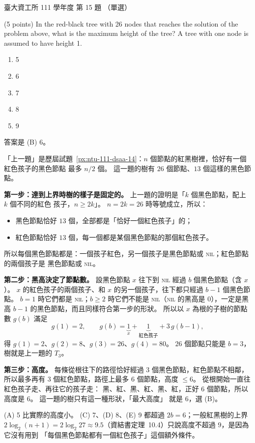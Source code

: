 \begin{pastexam}[label={px:ntu-111-dsaa-15}]{臺大資工所 111 學年度 第 15 題}
（單選）

(5 points) In the red-black tree with 26 nodes that reaches the solution of the problem above,
what is the maximum height of the tree? A tree with one node is assumed to have height 1.
\begin{enumerate}[label=(\Alph*)]
\item 5
\item 6
\item 7
\item 8
\item 9
\end{enumerate}
\end{pastexam}

\begin{pastsoln}
答案是 (B) 6。

「上一題」是歷屆試題~\ref{px:ntu-111-dsaa-14}：$n$ 個節點的紅黑樹裡，恰好有一個紅色孩子的黑色節點
最多 $n/2$ 個。 這一題的樹有 $26$ 個節點、$13$ 個這樣的黑色節點。

\textbf{第一步：達到上界時樹的樣子是固定的。} 上一題的證明是「$k$ 個黑色節點，配上 $k$ 個不同的紅色
孩子，$n \ge 2k$」。 $n = 2k = 26$ 時等號成立，所以：
\begin{itemize}
\item 黑色節點恰好 $13$ 個，全部都是「恰好一個紅色孩子」的；
\item 紅色節點恰好 $13$ 個，每一個都是某個黑色節點的那個紅色孩子。
\end{itemize}
所以每個黑色節點都是：一個孩子紅色，另一個孩子是黑色節點或 \textsc{nil}；紅色節點的兩個孩子是
黑色節點或 \textsc{nil}。

\textbf{第二步：黑高決定了節點數。} 設黑色節點 $x$ 往下到 \textsc{nil} 經過 $b$ 個黑色節點（含 $x$）。
$x$ 的紅色孩子的兩個孩子、和 $x$ 的另一個孩子，往下都只經過 $b - 1$ 個黑色節點。 $b = 1$ 時它們都是
\textsc{nil}；$b \ge 2$ 時它們不能是 \textsc{nil}（\textsc{nil} 的黑高是 $0$），一定是黑高 $b - 1$
的黑色節點，而且同樣符合第一步的形狀。 所以以 $x$ 為根的子樹的節點數 $g(b)$ 滿足
\[
g(1) = 2, \qquad g(b) = \underbrace{1}_{x} + \underbrace{1}_{\text{紅色孩子}} + 3\,g(b-1),
\]
得 $g(1) = 2$、$g(2) = 8$、$g(3) = 26$、$g(4) = 80$。 $26$ 個節點只能是 $b = 3$，樹就是上一題的
$T_3$。

\textbf{第三步：高度。} 每條從根往下的路徑恰好經過 $3$ 個黑色節點，紅色節點不相鄰，所以最多再有
$3$ 個紅色節點，路徑上最多 $6$ 個節點，高度 $\le 6$。 從根開始一直往紅色孩子走、再往它的孩子走：
黑、紅、黑、紅、黑、紅，正好 $6$ 個節點，所以高度是 $6$。 這一題的樹只有這一種形狀，「最大高度」
就是 $6$，選 (B)。

(A) 5 比實際的高度小。 (C) 7、(D) 8、(E) 9 都超過 $2b = 6$；一般紅黑樹的上界
$2\log_2(n+1) = 2\log_2 27 \approx 9.5$（資結書定理~10.4）只說高度不超過 $9$，是因為它沒有用到
「每個黑色節點都有一個紅色孩子」這個額外條件。
\end{pastsoln}
